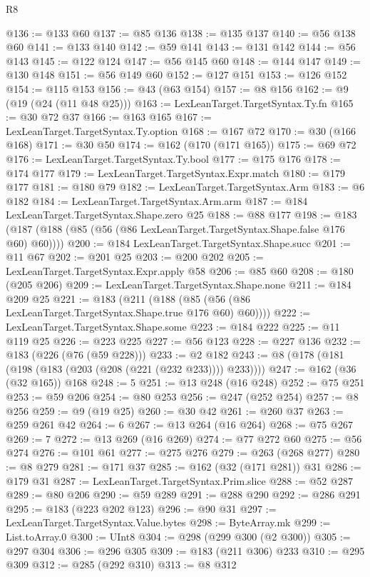 \begin{lexlean}{R8}
\begin{coremodule}
@136 := @133 @60
@137 := @85 @136
@138 := @135 @137
@140 := @56 @138 @60
@141 := @133 @140
@142 := @59 @141
@143 := @131 @142
@144 := @56 @143
@145 := @122 @124
@147 := @56 @145 @60
@148 := @144 @147
@149 := @130 @148
@151 := @56 @149 @60
@152 := @127 @151
@153 := @126 @152
@154 := @115 @153
@156 := @43 (@63 @154)
@157 := @8 @156
@162 := @9 (@19 (@24 (@11 @48 @25)))
@163 := LexLeanTarget.TargetSyntax.Ty.fn
@165 := @30 @72 @37
@166 := @163 @165
@167 := LexLeanTarget.TargetSyntax.Ty.option
@168 := @167 @72
@170 := @30 (@166 @168)
@171 := @30 @50
@174 := @162 (@170 (@171 @165))
@175 := @69 @72
@176 := LexLeanTarget.TargetSyntax.Ty.bool
@177 := @175 @176
@178 := @174 @177
@179 := LexLeanTarget.TargetSyntax.Expr.match
@180 := @179 @177
@181 := @180 @79
@182 := LexLeanTarget.TargetSyntax.Arm
@183 := @6 @182
@184 := LexLeanTarget.TargetSyntax.Arm.arm
@187 := @184 LexLeanTarget.TargetSyntax.Shape.zero @25
@188 := @88 @177
@198 := @183 (@187 (@188 (@85 (@56 (@86 LexLeanTarget.TargetSyntax.Shape.false @176 @60) @60))))
@200 := @184 LexLeanTarget.TargetSyntax.Shape.succ
@201 := @11 @67
@202 := @201 @25
@203 := @200 @202
@205 := LexLeanTarget.TargetSyntax.Expr.apply @58
@206 := @85 @60
@208 := @180 (@205 @206)
@209 := LexLeanTarget.TargetSyntax.Shape.none
@211 := @184 @209 @25
@221 := @183 (@211 (@188 (@85 (@56 (@86 LexLeanTarget.TargetSyntax.Shape.true @176 @60) @60))))
@222 := LexLeanTarget.TargetSyntax.Shape.some
@223 := @184 @222
@225 := @11 @119 @25
@226 := @223 @225
@227 := @56 @123
@228 := @227 @136
@232 := @183 (@226 (@76 (@59 @228)))
@233 := @2 @182
@243 := @8 (@178 (@181 (@198 (@183 (@203 (@208 (@221 (@232 @233)))) @233))))
@247 := @162 (@36 (@32 @165)) @168
@248 := 5
@251 := @13 @248 (@16 @248)
@252 := @75 @251
@253 := @59 @206
@254 := @80 @253
@256 := @247 (@252 @254)
@257 := @8 @256
@259 := @9 (@19 @25)
@260 := @30 @42
@261 := @260 @37
@263 := @259 @261 @42
@264 := 6
@267 := @13 @264 (@16 @264)
@268 := @75 @267
@269 := 7
@272 := @13 @269 (@16 @269)
@274 := @77 @272 @60
@275 := @56 @274
@276 := @101 @61
@277 := @275 @276
@279 := @263 (@268 @277)
@280 := @8 @279
@281 := @171 @37
@285 := @162 (@32 (@171 @281)) @31
@286 := @179 @31
@287 := LexLeanTarget.TargetSyntax.Prim.slice
@288 := @52 @287
@289 := @80 @206
@290 := @59 @289
@291 := @288 @290
@292 := @286 @291
@295 := @183 (@223 @202 @123)
@296 := @90 @31
@297 := LexLeanTarget.TargetSyntax.Value.bytes
@298 := ByteArray.mk
@299 := List.toArray.{0}
@300 := UInt8
@304 := @298 (@299 @300 (@2 @300))
@305 := @297 @304
@306 := @296 @305
@309 := @183 (@211 @306) @233
@310 := @295 @309
@312 := @285 (@292 @310)
@313 := @8 @312

\end{coremodule}
\end{lexlean}
